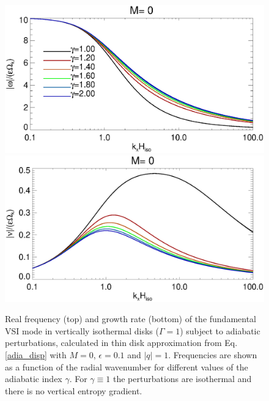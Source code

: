 \begin{figure}
  \includegraphics[width=\linewidth,clip=true,trim=0cm 1.75cm 0cm 0cm]{figures/rate_theory_om}
  \includegraphics[width=\linewidth,clip=true,trim=0cm 0cm 0cm 1cm]{figures/rate_theory_nu}
  \caption{Real frequency (top) and growth rate (bottom) of the fundamental VSI mode in vertically 
    isothermal disks ($\Gamma=1$) subject to adiabatic perturbations,
    calculated in thin disk approximation from Eq. \ref{adia_disp}
    with $M=0$, $\epsilon=0.1$ and  
    $|q|=1$. Frequencies are shown as a function of the radial
    wavenumber for different values of the adiabatic index
    $\gamma$. For $\gamma\equiv 1$ the perturbations are isothermal
    and there is no vertical entropy gradient.\label{adia_growth}}  
\end{figure}   